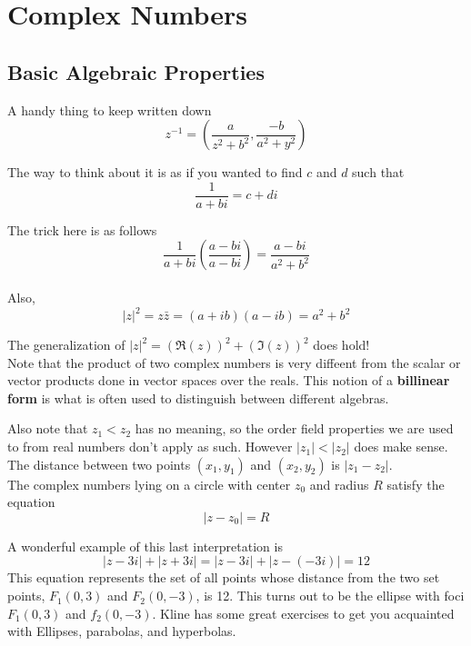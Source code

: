 \section{Complex Numbers}

\subsection{Basic Algebraic Properties}

A handy thing to keep written down
$$
z^{-1} = \left(\frac{a}{z^2 + b^2}, \frac{-b}{a^2 + y^2}\right)
$$

The way to think about it is as if you wanted to find $c$ and $d$ such that
$$
\frac{1}{a + bi} = c + di
$$

The trick here is as follows
$$
\frac{1}{a + bi} \left( \frac{a - bi}{a - bi} \right)= \frac{a - bi}{a^2 + b^2}
$$
\\



Also,
$$
|z|^2 = z\bar{z} = (a + ib)(a - ib) = a^2 + b^2
$$

The generalization of $|z|^2 = (\Re(z))^2 + (\Im(z))^2$ does hold!
\\


Note that the product of two complex numbers is very diffeent from the scalar or vector products
done in vector spaces over the reals.
This notion of a \textbf{billinear form} is what is often used to distinguish between different
algebras.

Also note that $z_1 < z_2$ has no meaning, so the order field properties we are used to from
real numbers don't apply as such.
However $|z_1| < |z_2|$ does make sense.
\\

The distance between two points $(x_1, y_1)$ and $(x_2, y_2)$ is $|z_1 - z_2|$.
\\

The complex numbers lying on a circle with center $z_0$ and radius $R$ satisfy the equation
$$
|z - z_0| = R
$$

A wonderful example of this last interpretation is
$$
|z - 3i| + |z + 3i| = |z - 3i| + |z - (-3i)| = 12
$$
This equation represents the set of all points whose distance from the two set points, $F_1(0,3)$
and $F_2(0,-3)$, is 12.
This turns out to be the ellipse with foci $F_1(0,3)$ and $f_2(0,-3)$.
Kline has some great exercises to get you acquainted with Ellipses, parabolas, and hyperbolas.


